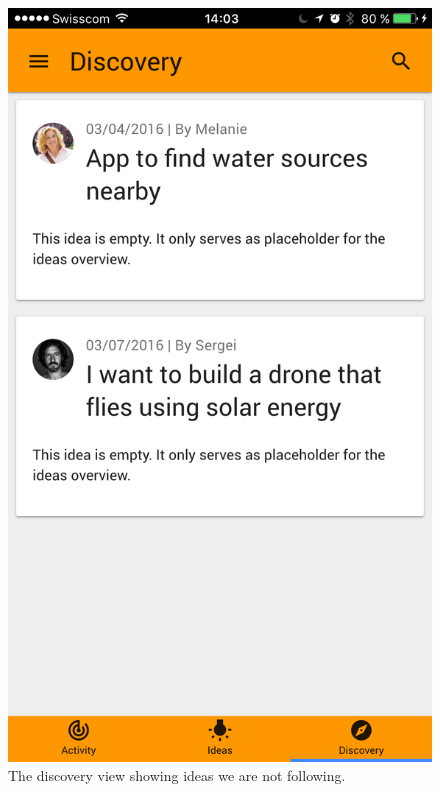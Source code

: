 \documentclass[a4paper,12pt,twoside]{article}
\begin{document}
\begin{figure}[!htb]
    \begin{minipage}[t]{.48\textwidth}
        \centering
        \includegraphics[width=.67\textwidth]{images/flow_follow_1.png}
        \caption{The discovery view showing ideas we are not following.}
    \end{minipage}
    \hfill
    \begin{minipage}[t]{.48\textwidth}
        \centering

\end{minipage}
\end{figure}
\end{document}
